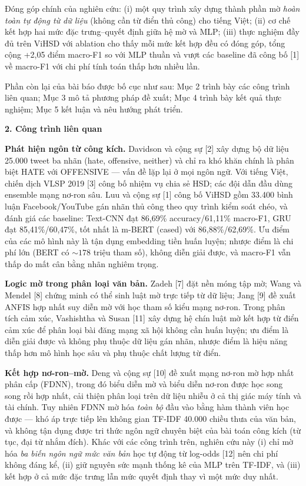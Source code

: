 \documentclass[11pt,a4paper]{article}
\newcommand{\secvn}[1]{\vspace{6pt}\noindent\textbf{#1}\vspace{6pt}\par\nopagebreak}
\begin{document}
Đóng góp chính của nghiên cứu: (i) một quy trình xây dựng thành phần mờ \textit{hoàn toàn tự động từ dữ liệu} (không cần từ điển thủ công) cho tiếng Việt; (ii) cơ chế kết hợp hai mức đặc trưng--quyết định giữa hệ mờ và MLP; (iii) thực nghiệm đầy đủ trên ViHSD với ablation cho thấy mỗi mức kết hợp đều có đóng góp, tổng cộng +2,05 điểm macro-F1 so với MLP thuần và vượt các baseline đã công bố [1] về macro-F1 với chi phí tính toán thấp hơn nhiều lần.

Phần còn lại của bài báo được bố cục như sau: Mục 2 trình bày các công trình liên quan; Mục 3 mô tả phương pháp đề xuất; Mục 4 trình bày kết quả thực nghiệm; Mục 5 kết luận và nêu hướng phát triển.

\secvn{2. Công trình liên quan}

\textbf{Phát hiện ngôn từ công kích.} Davidson và cộng sự [2] xây dựng bộ dữ liệu 25.000 tweet ba nhãn (hate, offensive, neither) và chỉ ra khó khăn chính là phân biệt HATE với OFFENSIVE — vấn đề lặp lại ở mọi ngôn ngữ. Với tiếng Việt, chiến dịch VLSP 2019 [3] công bố nhiệm vụ chia sẻ HSD; các đội dẫn đầu dùng ensemble mạng nơ-ron sâu. Luu và cộng sự [1] công bố ViHSD gồm 33.400 bình luận Facebook/YouTube gán nhãn thủ công theo quy trình kiểm soát chéo, và đánh giá các baseline: Text-CNN đạt 86,69\% accuracy/61,11\% macro-F1, GRU đạt 85,41\%/60,47\%, tốt nhất là m-BERT (cased) với 86,88\%/62,69\%. Ưu điểm của các mô hình này là tận dụng embedding tiền huấn luyện; nhược điểm là chi phí lớn (BERT có ${\sim}178$ triệu tham số), không diễn giải được, và macro-F1 vẫn thấp do mất cân bằng nhãn nghiêm trọng.

\textbf{Logic mờ trong phân loại văn bản.} Zadeh [7] đặt nền móng tập mờ; Wang và Mendel [8] chứng minh có thể sinh luật mờ trực tiếp từ dữ liệu; Jang [9] đề xuất ANFIS hợp nhất suy diễn mờ với học tham số kiểu mạng nơ-ron. Trong phân tích cảm xúc, Vashishtha và Susan [11] xây dựng hệ chín luật mờ kết hợp từ điển cảm xúc để phân loại bài đăng mạng xã hội không cần huấn luyện; ưu điểm là diễn giải được và không phụ thuộc dữ liệu gán nhãn, nhược điểm là hiệu năng thấp hơn mô hình học sâu và phụ thuộc chất lượng từ điển.

\textbf{Kết hợp nơ-ron--mờ.} Deng và cộng sự [10] đề xuất mạng nơ-ron mờ hợp nhất phân cấp (FDNN), trong đó biểu diễn mờ và biểu diễn nơ-ron được học song song rồi hợp nhất, cải thiện phân loại trên dữ liệu nhiễu ở cả thị giác máy tính và tài chính. Tuy nhiên FDNN mờ hóa \textit{toàn bộ} đầu vào bằng hàm thành viên học được — khó áp trực tiếp lên không gian TF-IDF 40.000 chiều thưa của văn bản, và không tận dụng được tri thức ngôn ngữ chuyên biệt của bài toán công kích (từ tục, đại từ nhắm đích). Khác với các công trình trên, nghiên cứu này (i) chỉ mờ hóa \textit{ba biến ngôn ngữ mức văn bản} học tự động từ log-odds [12] nên chi phí không đáng kể, (ii) giữ nguyên sức mạnh thống kê của MLP trên TF-IDF, và (iii) kết hợp ở cả mức đặc trưng lẫn mức quyết định thay vì một mức duy nhất.
\end{document}
